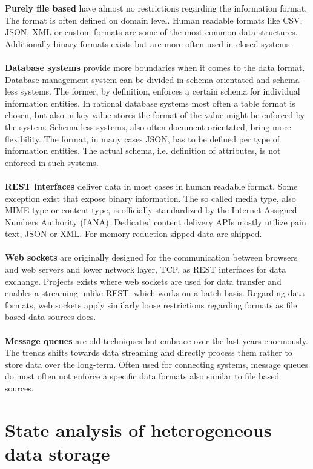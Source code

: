 \noindent\textbf{Purely file based} have almost no restrictions regarding the information format. The format is often defined on domain level. Human readable formats like CSV, JSON, XML or custom formats are some of the most common data structures. Additionally binary formats exists but are more often used in closed systems.
\\\\
\textbf{Database systems} provide more boundaries when it comes to the data format. Database management system can be divided in schema-orientated and schema-less systems. The former, by definition, enforces a certain schema for individual information entities. In rational database systems most often a table format is chosen, but also in key-value stores the format of the value might be enforced by the system. Schema-less systems, also often document-orientated, bring more flexibility. The format, in many cases JSON, has to be defined per type of information entities. The actual schema, i.e. definition of attributes, is not enforced in such systems.
\\\\
\textbf{REST interfaces} deliver data in most cases in human readable format. Some exception exist that expose binary information. The so called media type, also MIME type or content type, is officially standardized by the Internet Assigned Numbers Authority (IANA). Dedicated content delivery APIs mostly utilize pain text, JSON or XML. For memory reduction zipped data are shipped. 
\\\\
\textbf{Web sockets} are originally designed for the communication between browsers and web servers and lower network layer, TCP, as REST interfaces for data exchange. Projects exists where web sockets are used for data transfer and enables a streaming unlike REST, which works on a batch basis. Regarding data formats, web sockets apply similarly loose restrictions regarding formats as file based data sources does.
\\\\
\textbf{Message queues} are old techniques but embrace over the last years enormously. The trends shifts towards data streaming and directly process them rather to store data over the long-term. Often used for connecting systems, message queues do most often not enforce a specific data formats also similar to file based sources.

\section{State analysis of heterogeneous data storage\label{sec:stateanalysis}}

